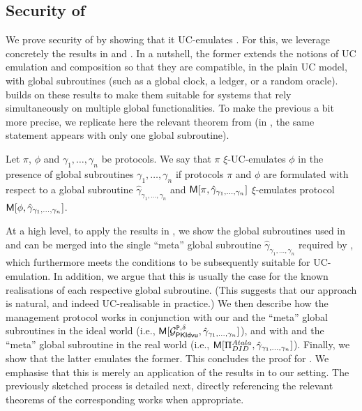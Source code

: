 \subsection{Security of \RealPKIDIDAtala}
\label{ssec:sec-didatala}

We prove security of \RealPKIDIDAtala by showing that it UC-emulates
\IdealGPKIDID. For this, we leverage concretely the results in \cite{bch+20} and
\cite{bhz21}. In a nutshell, the former extends the notions of UC emulation and
composition so that they are compatible, in the plain UC model, with global
subroutines (such as a global clock, a ledger, or a random oracle).
\cite{bhz21} builds on these results to make them suitable for systems that rely
simultaneously on multiple global functionalities.
%
To make the previous a bit more precise, we replicate here the relevant theorem
from \cite{bhz21} (in \cite{bch+20}, the same statement appears with only one
global subroutine).

\begin{theorem}
  \label{thm:uc-bhz21}
  Let $\pi$, $\phi$ and $\gamma_1,\dots,\gamma_n$ be protocols. We say that
  $\pi$ $\xi$-UC-emulates $\phi$ in the presence of global subroutines
  $\gamma_1,\dots,\gamma_n$ if protocols $\pi$ and $\phi$ are formulated with
  respect to a global subroutine $\hat{\gamma}_{\gamma_1,\dots,\gamma_n}$ and
  $\mathsf{M}[\pi,\hat{\gamma}_{\gamma_1,\dots,\gamma_n}]$ $\xi$-emulates protocol
  $\mathsf{M}[\phi,\hat{\gamma}_{\gamma_1,\dots,\gamma_n}]$.
\end{theorem}

At a high level, to apply the results in \cite{bch+20,bhz21}, we show the global
subroutines used in \IdealGPKIDID and \RealPKIDIDAtala can be merged into the
single ``meta'' global subroutine $\hat{\gamma}_{\gamma_1,\dots,\gamma_n}$
required by , which furthermore meets the conditions to be
subsequently suitable for UC-emulation. In addition, we argue that this is
usually the case for the known realisations of each respective global
subroutine. (This suggests that our approach is natural, and indeed
UC-realisable in practice.)
%
We then describe how the management protocol \UCM works in conjunction with
our \IdealGPKIDID and the ``meta'' global subroutines in the ideal world (i.e.,
$\mathsf{M}[\mathcal{G}^{\mathtt{P},\delta}_{\mathsf{PKIdvu}},\hat{\gamma}_{\gamma_1,\dots,\gamma_n}]$), and
with \RealPKIDIDAtala and the ``meta'' global subroutine in the real world
(i.e., $\mathsf{M}[\Pi_{DID}^{Atala},\hat{\gamma}_{\gamma_1,\dots,\gamma_n}]$).
%
Finally, we show that the latter emulates the former. This concludes the proof
for .
%
We emphasise that this is merely an application of the results in
\cite{bch+20,bhz21} to our setting. The previously sketched process is detailed
next, directly referencing the relevant theorems of the corresponding works when
appropriate.

